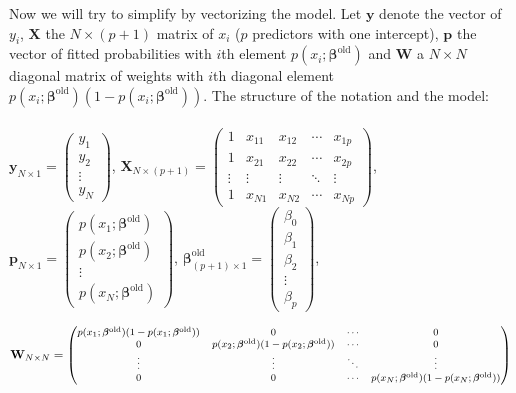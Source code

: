 \documentclass[12pt,a4paper]{article}%
\theoremstyle{definition}
\theoremstyle{plain}
\numberwithin{equation}{section}
\begin{document}
Now we will try to simplify by vectorizing the model. Let $\mathbf{y}$ denote the vector of $y_{i}$,
$\mathbf{X}$ the $N \times (p+1)$ matrix of $x_{i}$ ($p$ predictors with one intercept),
$\mathbf{p}$ the vector of fitted probabilities with $i$th element $p(x_{i};\boldsymbol{\beta}^{\text{old}})$ and
$\mathbf{W}$ a $N \times N$ diagonal matrix of weights with $i$th diagonal element $p(x_{i};\boldsymbol{\beta}^{\text{old}})(1-p(x_{i};\boldsymbol{\beta}^{\text{old}}))$.
The structure of the notation and the model: ~\\~\\

$
\mathbf{y}_{N \times 1} = \begin{pmatrix}
  y_{1}  \\
  y_{2}  \\
  \vdots  \\
  y_{N}
 \end{pmatrix}
$,
$
\mathbf{X}_{N \times (p+1)} = \begin{pmatrix}
  1 & x_{11} & x_{12} & \cdots & x_{1p} \\
  1 & x_{21} & x_{22} & \cdots & x_{2p} \\
  \vdots & \vdots & \vdots & \ddots & \vdots  \\
  1 & x_{N1} & x_{N2} & \cdots & x_{Np}
 \end{pmatrix}
$, ~\\

$
\mathbf{p}_{N \times 1} = \begin{pmatrix}
  p(x_{1};\boldsymbol{\beta}^{\text{old}})  \\
  p(x_{2};\boldsymbol{\beta}^{\text{old}})  \\
  \vdots  \\
  p(x_{N};\boldsymbol{\beta}^{\text{old}})
 \end{pmatrix}
$,
$
\boldsymbol{\beta}^{\text{old}}_{(p+1) \times 1} = \begin{pmatrix}
  \beta_{0}  \\
  \beta_{1}  \\
  \beta_{2}  \\
  \vdots  \\
  \beta_{p}
 \end{pmatrix}
$,

\begin{gather*}
\footnotesize
\mathbf{W}_{N \times N} = \begin{pmatrix}
  p(x_{1};\boldsymbol{\beta}^{\text{old}})(1-p(x_{1};\boldsymbol{\beta}^{\text{old}})) & 0 & \cdots & 0 \\
  0 & p(x_{2};\boldsymbol{\beta}^{\text{old}})(1-p(x_{2};\boldsymbol{\beta}^{\text{old}})) & \cdots & 0 \\
  \vdots & \vdots & \ddots & \vdots  \\
  0 & 0 & \cdots & p(x_{N};\boldsymbol{\beta}^{\text{old}})(1-p(x_{N};\boldsymbol{\beta}^{\text{old}}))
 \end{pmatrix}
\end{gather*}
\end{document}
